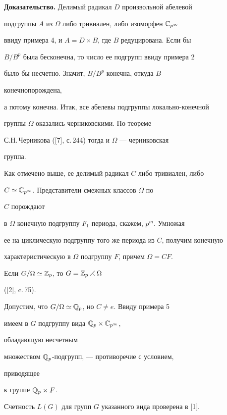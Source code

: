  


{\bf Доказательство.} Делимый радикал $D$ произвольной абелевой  


подгруппы $A$ из $\Omega$ либо тривиален, либо изоморфен $\Bbb 


C_{p^\infty}$ 


ввиду примера 4, и $A=D\times B$, где $B$ редуцирована. Если бы  


$B/B^p$ была бесконечна, то число ее подгрупп ввиду примера 2  


было бы несчетно. Значит, $B/B^p$ конечна, откуда $B$ 


конечнопорождена, 


а потому конечна. Итак, все абелевы подгруппы локально-конечной 


группы $\Omega$ оказались черниковскими. По теореме 


С.Н.\,Черникова ([7], с.\,244) тогда и $\Omega$ --- черниковская 


группа. 


Как отмечено выше, ее делимый радикал $C$ либо тривиален, либо 


$C\simeq\Bbb C_{p^\infty}$. Представители смежных классов $\Omega$ по 


$C$ порождают 


в $\Omega$ конечную подгруппу $F_1$ периода, скажем, $p^m$. Умножая  


ее на циклическую подгруппу того же периода из $C$, получим конечную 


характеристическую в $\Omega$ подгруппу $F$, причем $\Omega=CF$. 


Если $G/\Omega\simeq\Bbb Z_p$, то $G=\Bbb Z_p\rightthreetimes\Omega$ 


([2], c.\,75). 


 


Допустим, что $G/\Omega\simeq\Bbb Q_p$, но $C\ne e$. Ввиду примера 5  


имеем в $G$ подгруппу вида $\Bbb Q_p\times\Bbb C_{p^\infty}$, 


обладающую несчетным 


множеством $\Bbb Q_p$-подгрупп, --- противоречие с условием, 


приводящее 


к группе $\Bbb Q_p\times F$. 


 


Счетность $L(G)$ для групп $G$ указанного вида проверена в [1]. 


